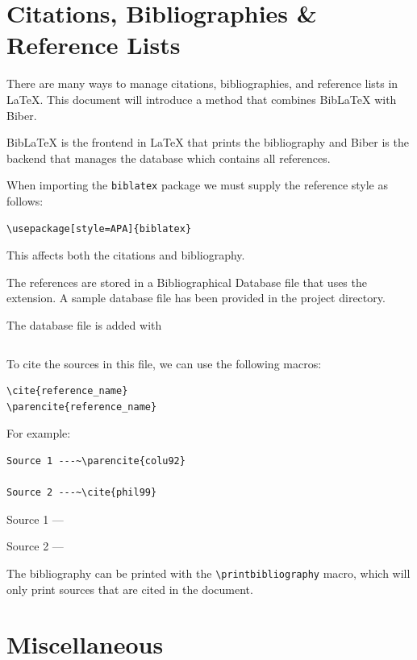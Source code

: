 \documentclass[11pt, twoside]{article}
\begin{document}
\section{Citations, Bibliographies \& Reference Lists}
There are many ways to manage citations, bibliographies, and reference lists in \LaTeX{}. This document will introduce a method that combines BibLaTeX with Biber.

BibLaTeX is the frontend in \LaTeX{} that prints the bibliography and Biber is the backend that manages the database which contains all references.

When importing the \lstinline{biblatex} package we must supply the reference style as follows:
\begin{lstlisting}
\usepackage[style=APA]{biblatex}
\end{lstlisting}
This affects both the citations and bibliography.

The references are stored in a Bibliographical Database file that uses the  extension. A sample database file has been provided in the project directory.

The database file is added with
\begin{lstlisting}

\end{lstlisting}
To cite the sources in this file, we can use the following macros:
\begin{lstlisting}
\cite{reference_name}
\parencite{reference_name}
\end{lstlisting}
For example:
\begin{lstlisting}
Source 1 ---~\parencite{colu92} 

Source 2 ---~\cite{phil99}
\end{lstlisting}
\begin{outputbox}
    Source 1 ---~\parencite{colu92}

    Source 2 ---~\cite{phil99}
\end{outputbox}
The bibliography can be printed with the \lstinline{\printbibliography} macro, which will only print sources that are cited in the document.
\newpage
\section{Miscellaneous}
\end{document}
